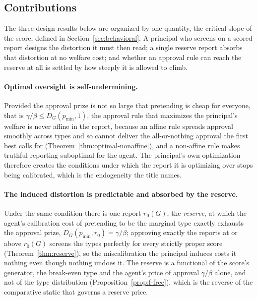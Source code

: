 \documentclass[acmsmall,nonacm,screen]{acmart}
\theoremstyle{acmplain}%
\theoremstyle{acmdefinition}%
\numberwithin{equation}{section}
\begin{document}
\subsection{Contributions}
\label{sec:contributions}

The three design results below are organized by one quantity, the critical slope of the score, defined in Section~\ref{sec:behavioral}. A principal who screens on a scored report designs the distortion it must then read; a single reserve report absorbs that distortion at no welfare cost; and whether an approval rule can reach the reserve at all is settled by how steeply it is allowed to climb.

\paragraph{Optimal oversight is self-undermining.} Provided the approval prize is not so large that pretending is cheap for everyone, that is $\gamma/\beta \leq D_G(p_{\min}, 1)$, the approval rule that maximizes the principal's welfare is never affine in the report, because an affine rule spreads approval smoothly across types and so cannot deliver the all-or-nothing approval the first best calls for (Theorem~\ref{thm:optimal-nonaffine}), and a non-affine rule makes truthful reporting suboptimal for the agent. The principal's own optimization therefore creates the conditions under which the report it is optimizing over stops being calibrated, which is the endogeneity the title names.

\paragraph{The induced distortion is predictable and absorbed by the reserve.} Under the same condition there is one report $r_0(G)$, the \emph{reserve}, at which the agent's calibration cost of pretending to be the marginal type exactly exhausts the approval prize, $D_G(p_{\min}, r_0) = \gamma/\beta$; approving exactly the reports at or above $r_0(G)$ screens the types perfectly for every strictly proper score (Theorem~\ref{thm:reserve}), so the miscalibration the principal induces costs it nothing even though nothing undoes it. The reserve is a functional of the score's generator, the break-even type and the agent's price of approval $\gamma/\beta$ alone, and not of the type distribution (Proposition~\ref{prop:f-free}), which is the reverse of the comparative static that governs a \citet{myerson1981optimal} reserve price.
\end{document}
